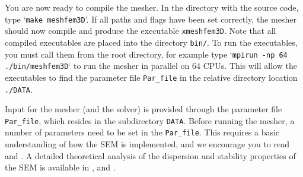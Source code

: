 \documentclass[oneside,english]{book}
\begin{document}
You are now ready to compile the mesher. In the directory with the
source code, type `\texttt{make meshfem3D}'. If all paths and flags
have been set correctly, the mesher should now compile and produce
the executable \texttt{xmeshfem3D}.
Note that all compiled executables are placed into the directory \texttt{bin/}.
To run the executables, you must call them from the root directory,
for example type `\texttt{mpirun -np 64 ./bin/meshfem3D}` to run the mesher
in parallel on 64 CPUs. This will allow the executables to find the parameter file
\texttt{Par\_file} in the relative directory location \texttt{./DATA}.

Input for the mesher (and the solver) is provided through the parameter
file \texttt{Par\_file}, which resides in the subdirectory \texttt{DATA}.
Before running the mesher, a number of parameters need to be set in
the \texttt{Par\_file}. This requires a basic understanding of how
the SEM is implemented, and we encourage you to read \citet{KoVi98,KoTr99,Ch00,KoTr02a,KoTr02b,KoRiTr02,ChCaVi03,CaChViMo03}
and \citet{ChVa04}. A detailed theoretical analysis of the dispersion
and stability properties of the SEM is available in \citet{Coh02}, \citet{DeSe07}
and \citet{SeOl07}.
\end{document}
